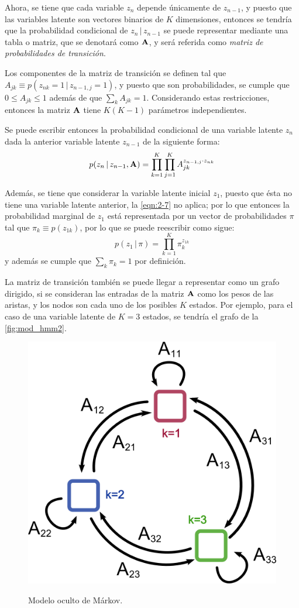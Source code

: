 Ahora, se tiene que cada variable $z_n$ depende únicamente de $z_{n-1}$, y puesto que las variables latente son vectores binarios de $K$ dimensiones, entonces se tendría que la probabilidad condicional de $z_n \,|\, z_{n-1}$ se puede representar mediante una tabla o matriz, que se denotará como $\textbf{A}$, y será referida como \textit{matriz de probabilidades de transición}. 

Los componentes de la matriz de transición se definen tal que $A_{jk} \equiv p(z_{nk} = 1 \,|\,  z_{n-1, j} = 1)$, y puesto que son probabilidades, se cumple que $0 \leq A_{jk} \leq 1$ además de que $\sum_k A_{jk} = 1$. Considerando estas restricciones, entonces la matriz $\textbf{A}$ tiene $K (K-1)$ parámetros independientes.

Se puede escribir entonces la probabilidad condicional de una variable latente $z_n$ dada la anterior variable latente $z_{n-1}$ de la siguiente forma: 
\begin{equation}
\label{eqn:2-8}
p(z_n \,|\, z_{n-1}, \textbf{A}) = \prod_{k=1}^K \prod_{j=1}^K A_{jk}^{z_{n-1, j} 
        \cdot z_{nk}}
\end{equation}

Además, se tiene que considerar la variable latente inicial $z_1$, puesto que ésta no tiene una variable latente anterior, la \autoref{eqn:2-7} no aplica; por lo que entonces la probabilidad marginal de $z_1$ está representada por un vector de probabilidades $\pi$ tal que $\pi_k \equiv p(z_{1k})$, por lo que se puede reescribir como sigue: 
\begin{equation}
p(z_1 \,|\, \pi) = \prod_{k=1}^K \pi_k^{z_{1k}}
\label{eqn:2-9}
\end{equation}
y además se cumple que $\sum_k \pi_k = 1$ por definición.

La matriz de transición también se puede llegar a representar como un grafo dirigido, si se consideran las entradas de la matriz $\textbf{A}$ como los pesos de las aristas, y los nodos son cada uno de los posibles $K$ estados. Por ejemplo, para el caso de una variable latente de $K = 3$ estados, se tendría el grafo de la \autoref{fig:mod_hmm2}.

\begin{figure}[hbt]
        \myfloatalign
        {\includegraphics[width=0.4\linewidth]{gfx/chap2/mod-hmm2}}
        \caption{Modelo oculto de Márkov.}
        \label{fig:mod_hmm2}
\end{figure}

